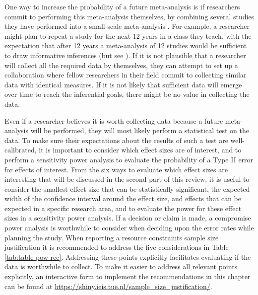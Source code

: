 \documentclass[
  oneside]{krantz}
\begin{document}
One way to increase the probability of a future meta-analysis is if researchers commit to performing this meta-analysis themselves, by combining several studies they have performed into a small-scale meta-analysis \citep{cumming_new_2014}. For example, a researcher might plan to repeat a study for the next 12 years in a class they teach, with the expectation that after 12 years a meta-analysis of 12 studies would be sufficient to draw informative inferences (but see \citet{ter_schure_accumulation_2019}). If it is not plausible that a researcher will collect all the required data by themselves, they can attempt to set up a collaboration where fellow researchers in their field commit to collecting similar data with identical measures. If it is not likely that sufficient data will emerge over time to reach the inferential goals, there might be no value in collecting the data.

Even if a researcher believes it is worth collecting data because a future meta-analysis will be performed, they will most likely perform a statistical test on the data. To make sure their expectations about the results of such a test are well-calibrated, it is important to consider which effect sizes are of interest, and to perform a sensitivity power analysis to evaluate the probability of a Type II error for effects of interest. From the six ways to evaluate which effect sizes are interesting that will be discussed in the second part of this review, it is useful to consider the smallest effect size that can be statistically significant, the expected width of the confidence interval around the effect size, and effects that can be expected in a specific research area, and to evaluate the power for these effect sizes in a sensitivity power analysis. If a decision or claim is made, a compromise power analysis is worthwhile to consider when deciding upon the error rates while planning the study. When reporting a resource constraints sample size justification it is recommended to address the five considerations in Table \ref{tab:table-pow-rec}. Addressing these points explicitly facilitates evaluating if the data is worthwhile to collect. To make it easier to address all relevant points explicitly, an interactive form to implement the recommendations in this chapter can be found at \url{https://shiny.ieis.tue.nl/sample_size_justification/}.
\end{document}
